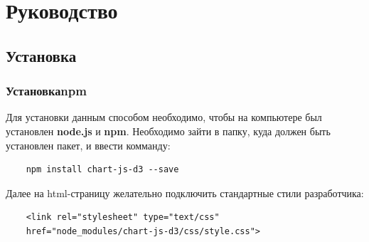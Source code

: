\documentclass[a4paper,14pt]{extreport}
\begin{document}
\chapter{Руководство}
\section{Установка}
\subsection{Установка\enspace npm}
\hspace{4ex}Для установки данным способом необходимо, чтобы на компьютере был установлен \textbf{node.js} и \textbf{npm}.
\hspace{4ex}Необходимо зайти в папку, куда должен быть установлен пакет, и ввести комманду:
\begin{verbatim}
    npm install chart-js-d3 --save
\end{verbatim}
\hspace{4ex}Далее на html-страницу желательно подключить стандартные стили разработчика:
\begin{verbatim}
    <link rel="stylesheet" type="text/css" 
    href="node_modules/chart-js-d3/css/style.css">
\end{verbatim} 
\end{document}
